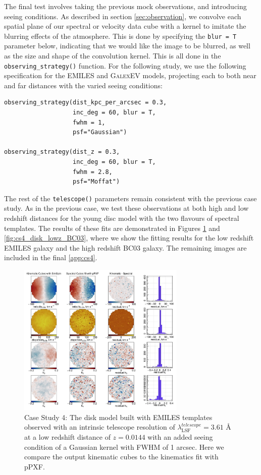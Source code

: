 \documentclass[
  journal=pasa,
  manuscript=research-paper, %
  year=2020,
  volume=37,
]{cup-journal}
\newcommand{\telescope}[1]{\texttt{telescope()}#1}
\newcommand{\observingstrategy}[1]{\texttt{observing\_strategy()}#1}
\begin{document}
The final test involves taking the previous mock observations, and introducing seeing conditions. 
As described in section \ref{sec:observation}, we convolve each spatial plane of our spectral or velocity data cube with a kernel to imitate the blurring effects of the atmosphere. 
This is done by specifying the \texttt{blur = T} parameter below, indicating that we would like the image to be blurred, as well as the size and shape of the convolution kernel. 
This is all done in the \observingstrategy{} function. 
For the following study, we use the following specification for the EMILES and \textsc{GalexEV} models, projecting each to both near and far distances with the varied seeing conditions:

\begin{lstlisting}[basicstyle=\fontsize{6}{8}\selectfont\ttfamily]
observing_strategy(dist_kpc_per_arcsec = 0.3, 
                   inc_deg = 60, blur = T,
                   fwhm = 1, 
                   psf="Gaussian")

observing_strategy(dist_z = 0.3, 
                   inc_deg = 60, blur = T,
                   fwhm = 2.8, 
                   psf="Moffat")
\end{lstlisting}

The rest of the \telescope{} parameters remain consistent with the previous case study. 
As in the previous case, we test these observations at both high and low redshift distances for the young disc model with the two flavours of spectral templates.
The results of these fits are demonstrated in Figures \ref{fig:cs4_disk_lowz_EMILES} and \ref{fig:cs4_disk_lowz_BC03}, where we show the fitting results for the low redshift EMILES galaxy and the high redshift BC03 galaxy. 
The remaining images are included in the final \ref{app:cs4}.

\begin{figure}
    \centering
    \includegraphics[keepaspectratio, width=8cm]{Figures/cs4_disk_velocities_lowz_fwhm_blur_EMILES.jpeg}
    \caption{Case Study 4: The disk model built with EMILES templates observed with an intrinsic telescope resolution of  $\lambda_{\text{LSF}}^{telescope} = 3.61$ \AA{} at a low redshift distance of $z = 0.0144$ with an added seeing condition of a Gaussian kernel with FWHM of 1 arcsec. Here we compare the output kinematic cubes to the kinematics fit with pPXF.}
    \label{fig:cs4_disk_lowz_EMILES}
\end{figure}
\end{document}
